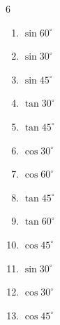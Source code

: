 \begin{multicols}{6}
\begin{enumerate}
  \item $\displaystyle \sin{60^\circ}$


  \item $\displaystyle \sin{30^\circ}$


  \item $\displaystyle \sin{45^\circ}$


  \item $\displaystyle \tan{30^\circ}$


  \item $\displaystyle \tan{45^\circ}$

        \phantom{$\displaystyle =1$}

  \item $\displaystyle \cos{30^\circ}$


  \item $\displaystyle \cos{60^\circ}$


  \item $\displaystyle \tan{45^\circ}$

        \phantom{$\displaystyle =1$}

  \item $\displaystyle \tan{60^\circ}$


  \item $\displaystyle \cos{45^\circ}$


  \item $\displaystyle \sin{30^\circ}$


  \item $\displaystyle \cos{30^\circ}$


  \item $\displaystyle \cos{45^\circ}$


\end{enumerate}
\end{multicols}
